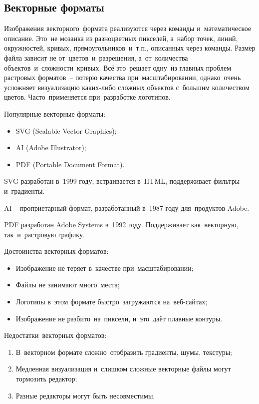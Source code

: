 \documentclass{ou}
\begin{document}
\subsection{Векторные форматы}
Изображения векторного~формата реализуются через команды и~математическое описание. Это~не мозаика из разноцветных пикселей, а~набор точек, линий, окружностей, кривых, прямоугольников~и~т.п., описанных через команды. Размер файла зависит не от~цветов~и~разрешения, а~от~количества объектов~и~сложности~кривых. Всё это~решает одну~из главных проблем растровых форматов~-- потерю качества при~масштабировании, однако~очень усложняет визуализацию каких-либо сложных объектов с~большим количеством цветов. Часто~применяется при~разработке логотипов.

Популярные векторные форматы: 

\begin{itemize}[label=-, leftmargin=0em, itemindent=3.35em, nosep]
\item SVG (Scalable Vector Graphics);
\item AI (Adobe Illustrator);
\item PDF (Portable Document Format).
\end{itemize}

SVG разработан в~1999 году, встраивается в~HTML, поддерживает фильтры и~градиенты.

AI -- проприетарный формат, разработанный в~1987 году для~продуктов Adobe.

PDF разработан Adobe Systems в~1992 году. Поддерживает как~векторную, так~и~растровую графику.

Достоинства векторных форматов:
\begin{itemize}[label=-, leftmargin=0em, itemindent=3.35em, nosep]
\item Изображение не теряет в~качестве при~масштабировании;
\item Файлы не занимают много~места;
\item Логотипы в~этом формате быстро~загружаются на~веб-сайтах;
\item Изображение не разбито~на~пиксели, и~это~даёт плавные контуры.
\end{itemize}

Недостатки~векторных форматов:
\begin{enumerate}[leftmargin=0em, itemindent=3.68em, nosep, label=\arabic*)]
\item В~векторном формате сложно~отобразить градиенты, шумы, текстуры;
\item Медленная визуализация и~слишком сложные векторные файлы могут тормозить редактор;
\item Разные редакторы могут быть несовместимы.
\end{enumerate}
\end{document}
